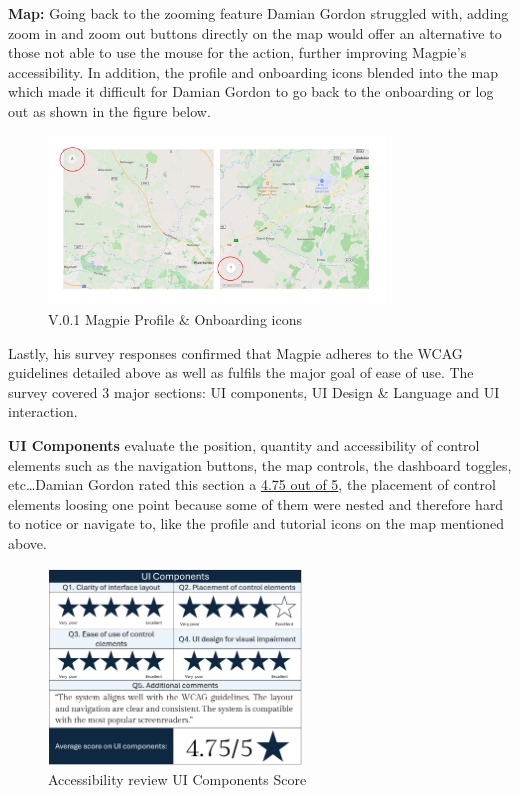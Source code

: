 \newpage{}

\noindent\textbf{Map: } Going back to the zooming feature Damian Gordon
struggled with, adding zoom in and zoom out buttons directly on the map would
offer an alternative to those not able to use the mouse for the action, further
improving Magpie's accessibility. In addition, the profile and onboarding icons
blended into the map which made it difficult for Damian Gordon to go back to the
onboarding or log out as shown in the figure below.

\begin{figure}[h!]
    \centering
    \includegraphics[width=0.8\textwidth]{images/old-icons-map.png}
    \caption{V.0.1 Magpie Profile \& Onboarding icons}
\end{figure}

Lastly, his survey responses confirmed that Magpie adheres to the WCAG
guidelines detailed above as well as fulfils the major goal of ease of use. The
survey covered 3 major sections: UI components, UI Design \& Language and UI
interaction.

\noindent\textbf{UI Components} evaluate the position, quantity and
accessibility of control elements such as the navigation buttons, the map
controls, the dashboard toggles, etc\ldots Damian Gordon rated this section a
\underline{4.75 out of 5}, the placement of control elements loosing one point
because some of them were nested and therefore hard to notice or navigate to,
like the profile and tutorial icons on the map mentioned above.

\begin{figure}[h!]
    \centering
    \includegraphics[width=0.6\textwidth]{images/accessb-survey-components.png}
    \caption{Accessibility review \- UI Components Score}
\end{figure}

